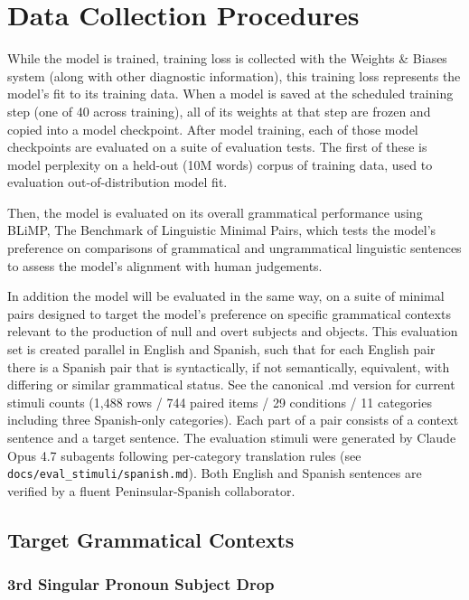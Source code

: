 \documentclass[12pt]{article}
\begin{document}
\section{Data Collection Procedures}

While the model is trained, training loss is collected with the Weights \& Biases system (along with other diagnostic information), this training loss represents the model's fit to its training data. When a model is saved at the scheduled training step (one of 40 across training), all of its weights at that step are frozen and copied into a model checkpoint. After model training, each of those model checkpoints are evaluated on a suite of evaluation tests. The first of these is model perplexity on a held-out (10M words) corpus of training data, used to evaluation out-of-distribution model fit.

Then, the model is evaluated on its overall grammatical performance using BLiMP, The Benchmark of Linguistic Minimal Pairs, which tests the model's preference on comparisons of grammatical and ungrammatical linguistic sentences to assess the model's alignment with human judgements.

In addition the model will be evaluated in the same way, on a suite of minimal pairs designed to target the model's preference on specific grammatical contexts relevant to the production of null and overt subjects and objects. This evaluation set is created parallel in English and Spanish, such that for each English pair there is a Spanish pair that is syntactically, if not semantically, equivalent, with differing or similar grammatical status. See the canonical .md version for current stimuli counts (1,488 rows / 744 paired items / 29 conditions / 11 categories including three Spanish-only categories). Each part of a pair consists of a context sentence and a target sentence. The evaluation stimuli were generated by Claude Opus 4.7 subagents following per-category translation rules (see \texttt{docs/eval\_stimuli/spanish.md}). Both English and Spanish sentences are verified by a fluent Peninsular-Spanish collaborator.

\subsection{Target Grammatical Contexts}

\subsubsection{3rd Singular Pronoun Subject Drop}
\end{document}
